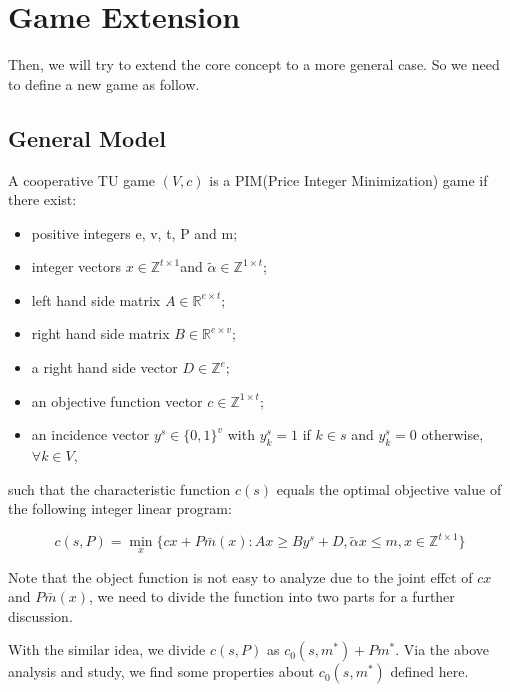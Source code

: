 \section{Game Extension}

Then, we will try to extend the core concept to a more general case. So we need to define a new game as follow.

\subsection*{General Model}

A cooperative TU game $(V,c)$ is a PIM(Price Integer Minimization) game if there exist:

\begin{itemize}
	\item positive integers e, v, t, P and m;
	\item integer vectors $ x \in \mathbb{Z}^{t \times 1} $and $ \tilde{\alpha} \in \mathbb{Z}^{1 \times t} $;
	\item left hand side matrix  $A \in \mathbb{R} ^{e \times t};$
	\item right hand side matrix $B \in \mathbb{R} ^ {e \times v};$
	\item a right hand side vector $D \in \mathbb{Z} ^ {e};$
	\item an objective function vector
	$c \in \mathbb{Z}^{1 \times t};$
	\item an incidence vector $y^s \in \{0,1\}^v$ with $y^s_k = 1$ if $k \in s$ and $y^s_k = 0 $ otherwise, $\forall k \in V$,

\end{itemize}

such that the characteristic function $c(s)$ equals the optimal objective value of the following integer linear program:

\[
c(s,P)= \mathop{\min}_{x} \{ cx+P\bar{m}(x): Ax \geq By^s+D, \tilde{\alpha}x \leq m, x \in \mathbb{Z}^{t \times 1} \}
\]

Note that the object function is not easy to analyze due to the joint effct of $cx$ and $P\bar{m}(x)$, we need to divide the function into two parts for a further discussion.

With the similar idea, we divide $c(s,P)$ as $c_0(s,m^*) + Pm^*$. Via the above analysis and study, we find some properties about $c_0(s,m^*)$ defined here.

